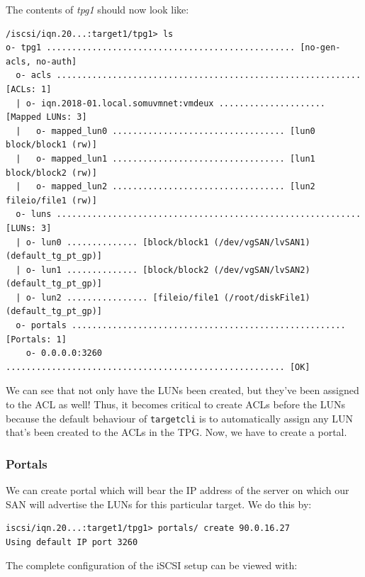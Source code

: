 \noindent
The contents of \textit{tpg1} should now look like:

\vspace{-15pt}
\begin{verbatim}
/iscsi/iqn.20...:target1/tpg1> ls
o- tpg1 ................................................. [no-gen-acls, no-auth]
  o- acls ............................................................ [ACLs: 1]
  | o- iqn.2018-01.local.somuvmnet:vmdeux ..................... [Mapped LUNs: 3]
  |   o- mapped_lun0 .................................. [lun0 block/block1 (rw)]
  |   o- mapped_lun1 .................................. [lun1 block/block2 (rw)]
  |   o- mapped_lun2 .................................. [lun2 fileio/file1 (rw)]
  o- luns ............................................................ [LUNs: 3]
  | o- lun0 .............. [block/block1 (/dev/vgSAN/lvSAN1) (default_tg_pt_gp)]
  | o- lun1 .............. [block/block2 (/dev/vgSAN/lvSAN2) (default_tg_pt_gp)]
  | o- lun2 ................ [fileio/file1 (/root/diskFile1) (default_tg_pt_gp)]
  o- portals ...................................................... [Portals: 1]
    o- 0.0.0.0:3260 ....................................................... [OK]
\end{verbatim}
\vspace{-10pt}

\noindent
We can see that not only have the LUNs been created, but they've been assigned to the ACL as well! Thus, it becomes critical to create ACLs before the LUNs because the default behaviour of \verb|targetcli| is to automatically assign any LUN that's been created to the ACLs in the TPG. Now, we have to create a portal. 

\subsubsection{Portals}
We can create portal which will bear the IP address of the server on which our SAN will advertise the LUNs for this particular target. We do this by:

\vspace{-15pt}
\begin{verbatim}
iscsi/iqn.20...:target1/tpg1> portals/ create 90.0.16.27
Using default IP port 3260
\end{verbatim}
\vspace{-10pt}

\noindent
The complete configuration of the iSCSI setup can be viewed with:

